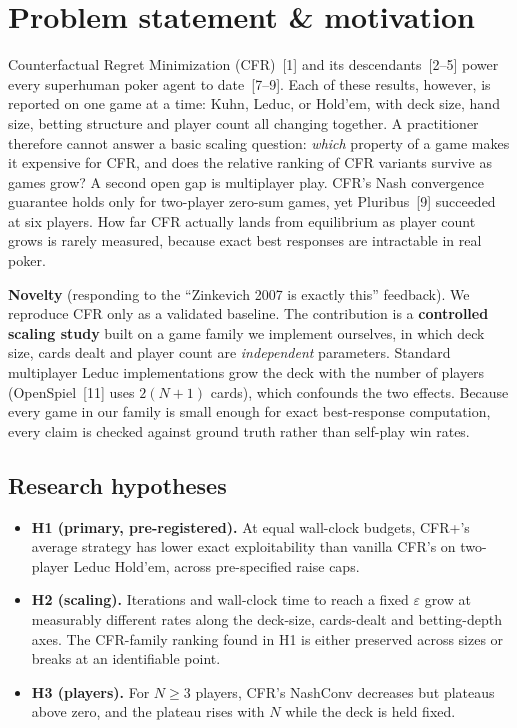 \documentclass[10pt,a4paper]{article}
\newcommand{\eps}{\varepsilon}
\begin{document}
\newpage
\setcounter{page}{1}

\section{Problem statement \& motivation}

Counterfactual Regret Minimization (CFR)~[1] and its descendants~[2--5] power every superhuman poker agent to date~[7--9]. Each of these results, however, is reported on one game at a time: Kuhn, Leduc, or Hold'em, with deck size, hand size, betting structure and player count all changing together. A practitioner therefore cannot answer a basic scaling question: \emph{which} property of a game makes it expensive for CFR, and does the relative ranking of CFR variants survive as games grow? A second open gap is multiplayer play. CFR's Nash convergence guarantee holds only for two-player zero-sum games, yet Pluribus~[9] succeeded at six players. How far CFR actually lands from equilibrium as player count grows is rarely measured, because exact best responses are intractable in real poker.

\textbf{Novelty} (responding to the ``Zinkevich 2007 is exactly this'' feedback). We reproduce CFR only as a validated baseline. The contribution is a \textbf{controlled scaling study} built on a game family we implement ourselves, in which deck size, cards dealt and player count are \emph{independent} parameters. Standard multiplayer Leduc implementations grow the deck with the number of players (OpenSpiel~[11] uses $2(N+1)$ cards), which confounds the two effects. Because every game in our family is small enough for exact best-response computation, every claim is checked against ground truth rather than self-play win rates.

\subsection{Research hypotheses}
\begin{itemize}
  \item \textbf{H1 (primary, pre-registered).} At equal wall-clock budgets, CFR+'s average strategy has lower exact exploitability than vanilla CFR's on two-player Leduc Hold'em, across pre-specified raise caps.
  \item \textbf{H2 (scaling).} Iterations and wall-clock time to reach a fixed $\eps$ grow at measurably different rates along the deck-size, cards-dealt and betting-depth axes. The CFR-family ranking found in H1 is either preserved across sizes or breaks at an identifiable point.
  \item \textbf{H3 (players).} For $N \ge 3$ players, CFR's NashConv decreases but plateaus above zero, and the plateau rises with $N$ while the deck is held fixed.
\end{itemize}
\end{document}
